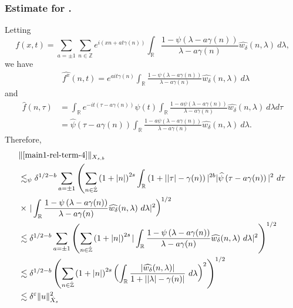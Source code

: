 \documentclass[12pt,reqno]{amsart}
\numberwithin{equation}{section}  %
\renewcommand{\cref}{\Cref}
\newcommand{\rr}{\mathbb{R}}
\newcommand{\zz}{\mathbb{Z}}
\newcommand{\zzdot}{\dot{\zz}}
\newcommand{\wh}{\widehat}
\newcommand{\ee}{\varepsilon}
\begin{document}
\subsubsection{Estimate for \cref{main1-rel-term-4}.}
Letting $$f(x,t) = \sum_{a = \pm 1}  \sum_{n \in \zz} e^{i\left( xn +
at\gamma(n) \right)} \int_\rr \frac{1 - \psi\left( \lambda - a\gamma(n) \right)}{\lambda - a\gamma(n)} 
\wh{w_{\delta}} \left( n, \lambda \right) \ d \lambda,$$ we have
%
%
\begin{equation*}
	\begin{split}
		& \wh{f^x}(n, t) = 
		e^{ait\gamma(n)} \int_\rr
		\frac{1 - \psi\left( \lambda - a\gamma(n) \right)}{\lambda - a\gamma(n)} 
		\wh{w_{\delta}}(n, \lambda) \ d \lambda
	\end{split}
\end{equation*}
and
\begin{equation*}
	\begin{split}
		 \wh{f}\left( n, \tau \right)
		 & = \int_\rr e^{-it\left( \tau - a\gamma(n) 
		\right)} \psi(t) \int_\rr \frac{1 - a\psi\left( 
		\lambda - a\gamma(n) 
		\right)}{\lambda - a\gamma(n)} \wh{w_{\delta}}(n, \lambda) \ d \lambda d \tau
		\\
    & = \wh{\psi}\left( \tau - a\gamma(n) \right) \int_\rr 
		\frac{1 - a\psi\left( 
		\lambda - a\gamma(n) 
		\right)}{\lambda - a\gamma(n)} \wh{w_{\delta}}(n, \lambda) \ d \lambda.
	\end{split}
\end{equation*}
Therefore,
%
%
\begin{equation}
  \label{iu}
	\begin{split}
		& \| \cref{main1-rel-term-4} \|_{X_{s,b}} 
		\\
    & \lesssim_{\psi} \delta^{1/2 - b}
    \sum_{a = \pm 1} \left( \sum_{n \in \zzdot} \left (1 + |n| \right)^{2s}
    \int_\rr \left( 1 + | |\tau| - \gamma(n) \right ) |^{2b} | \wh{\psi}\left(
    \tau - a\gamma(n) \right) |^2 \ d \tau \right.
		\\
		& \times \left . |
		\int_\rr \frac{1 - \psi\left( \lambda - a\gamma(n) \right)}{\lambda -
		a\gamma(n)} \wh{w_{\delta}}(n, \lambda) \ d \lambda |^2  \right)^{1/2}
		\\
		& \lesssim \delta^{1/2 - b}
 \sum_{a = \pm 1}\left( \sum_{n \in \zzdot} \left (1 + |n| \right )^{2s} | \int_\rr
		\frac{1 - \psi\left( \lambda - a\gamma(n) \right)}{\lambda - a\gamma(n)}
		\wh{w_{\delta}}(n, \lambda) \ d\lambda |^2 \right)^{1/2}
		\\
    & \lesssim \delta^{1/2 - b}  \left( \sum_{n \in \zzdot} \left (1 + |n| \right )^{2s}  \left ( \int_\rr
    \frac{|\wh{w_{\delta}}(n, \lambda)|}{1 + | |\lambda| - \gamma(n)|}
    \ d\lambda \right )^2 \right)^{1/2}
    \\
    & \lesssim \delta^{\ee} \| u \|_{\dot{X}_{s}}^{2}
	\end{split}
\end{equation}
\end{document}
